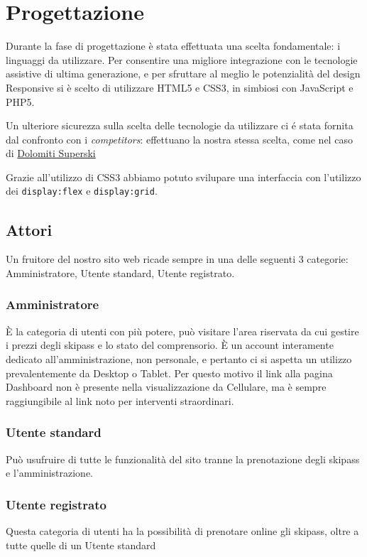 \section{Progettazione}
Durante la fase di progettazione è stata effettuata una scelta fondamentale: i linguaggi da utilizzare. Per consentire una migliore integrazione con le tecnologie assistive di ultima generazione, e per sfruttare al meglio le potenzialità del design Responsive
si è scelto di utilizzare HTML5 e CSS3, in simbiosi con JavaScript e PHP5.

Un ulteriore sicurezza sulla scelta delle tecnologie da utilizzare  ci é stata fornita dal confronto con i \textit{competitors}: effettuano la nostra stessa scelta, come nel caso di \href{www.dolomitisuperski.com}{Dolomiti Superski}

Grazie all'utilizzo di CSS3 abbiamo potuto svilupare una interfaccia con l'utilizzo dei \verb|display:flex| e \verb|display:grid|.


\subsection{Attori}
Un fruitore del nostro sito web ricade sempre in una delle seguenti 3 categorie: Amministratore, Utente standard, Utente registrato.
\subsubsection{Amministratore}
È la categoria di utenti con più potere, può visitare l'area riservata da cui gestire i prezzi degli skipass e lo stato del comprensorio.
È un account interamente dedicato all'amministrazione, non personale, e pertanto ci si aspetta un utilizzo prevalentemente da Desktop o Tablet. Per questo motivo il link alla pagina Dashboard non è presente nella visualizzazione da Cellulare, ma è sempre raggiungibile al link noto per interventi straordinari.
\subsubsection{Utente standard}
Può usufruire di tutte le funzionalità del sito tranne la prenotazione degli skipass e l'amministrazione.
\subsubsection{Utente registrato}
Questa categoria di utenti ha la possibilità di prenotare online gli skipass, oltre a tutte quelle di un Utente standard

